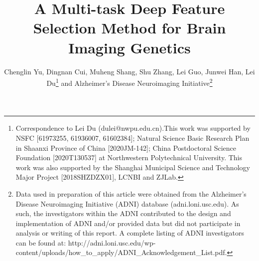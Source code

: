 \documentclass{llncs}
\begin{document}
\mainmatter                    %
%
\title{A Multi-task Deep Feature Selection Method for Brain Imaging Genetics}
%

\author{
Chenglin Yu, Dingnan Cui, Muheng Shang, Shu Zhang, Lei Guo, Junwei Han, Lei Du\thanks{Correspondence to Lei Du (dulei@nwpu.edu.cn).This work was supported by NSFC [61973255, 61936007, 61602384]; Natural Science Basic Research Plan in Shaanxi Province of China [2020JM-142]; China Postdoctoral Science Foundation [2020T130537] at Northwestern Polytechnical University. This work was also supported by the Shanghai Municipal Science and Technology Major Project [2018SHZDZX01], LCNBI and ZJLab.}
and Alzheimer's Disease Neuroimaging Initiative\thanks{Data used in preparation of this article were obtained from the Alzheimer's Disease Neuroimaging Initiative (ADNI) database (adni.loni.usc.edu). As such, the investigators within the ADNI contributed to the design and implementation of ADNI and/or provided data but did not participate in analysis or writing of this report. A complete listing of ADNI investigators can be found at: http://adni.loni.usc.edu/wp-content/uploads/how\_to\_apply/ADNI\_Acknowledgement\_List.pdf.}
}
%
%

\maketitle
\end{document}
